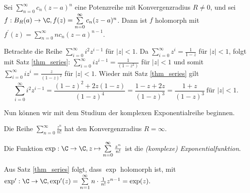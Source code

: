 \lecture
\begin{thm}\label{thm_series}
	Sei $ \sum\limits_{n=0}^\infty c_n (z-a)^n $ eine Potenzreihe mit Konvergenzradius $R \neq 0$, und sei $ f: B_R(a) \to \C, f(z) = \sum\limits_{n=0}^\infty c_n (z-a)^n $. Dann ist $f$ holomorph mit $ f^\prime(z) = \sum\limits_{n=0}^\infty n c_n (z-a)^{n-1} $.
\end{thm}
		
		\begin{exmp}
			Betrachte die Reihe $ \sum\limits_{i=0}^\infty i^2 z^{i-1} $ für $|z| < 1$. Da $ \sum\limits_{i=0}^\infty z^{i} = \frac{1}{1-z} $ für $|z|<1$, folgt mit Satz \ref{thm_series}: $ \sum\limits_{i=0}^\infty i z^{i-1} = \frac{1}{(1-z^2)} $ für $|z|<1$ und somit $ \sum\limits_{i=0}^\infty i z^{i} = \frac{z}{(1-z)^2} $ für $|z|<1$. Wieder mit Satz \ref{thm_series} gilt
			\[ \sum\limits_{i=0}^\infty i^2 z^{i-1} = \frac{(1-z)^2+2z(1-z)}{(1-z)^4} = \frac{1-z+2z}{(1-z)^3} = \frac{1+z}{(1-z)^3}\ \text{für } |z|<1. \]
		\end{exmp}
		
		Nun können wir mit dem Studium der komplexen Exponentialreihe beginnen.
		
		\begin{lem}
			Die Reihe $ \sum\limits_{n=0}^\infty \frac{z^n}{n!} $ hat den Konvergenzradius $ R = \infty $.
		\end{lem}
		
		\begin{defn}
			Die Funktion $ \exp: \C \to \C, z \mapsto \sum\limits_{n=0}^\infty \frac{z^n}{n!} $ ist die \emph{(komplexe) Exponentialfunktion}.
		\end{defn}
		
		Aus Satz \ref{thm_series} folgt, dass $\exp$ holomorph ist, mit $ \exp^\prime:\C \to \C, \exp^\prime(z) = \sum\limits_{n=1}^\infty n \cdot \frac{1}{n!} z^{n-1} = \exp(z). $\\
		
